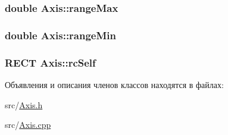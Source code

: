 \hypertarget{class_axis_a02853da582831baaa9ebc1289d86ad35}{
\subsubsection[{range\-Max}]{\setlength{\rightskip}{0pt plus 5cm}double Axis\-::range\-Max\hspace{0.3cm}{\ttfamily [protected]}}}\label{class_axis_a02853da582831baaa9ebc1289d86ad35}
\hypertarget{class_axis_adb0e6da2c0521df03e3e7d820d73af82}{
\subsubsection[{range\-Min}]{\setlength{\rightskip}{0pt plus 5cm}double Axis\-::range\-Min\hspace{0.3cm}{\ttfamily [protected]}}}\label{class_axis_adb0e6da2c0521df03e3e7d820d73af82}
\hypertarget{class_axis_a50bf5f208bbca7d528ca52e62b7928e9}{
\subsubsection[{rc\-Self}]{\setlength{\rightskip}{0pt plus 5cm}R\-E\-C\-T Axis\-::rc\-Self\hspace{0.3cm}{\ttfamily [protected]}}}\label{class_axis_a50bf5f208bbca7d528ca52e62b7928e9}


Объявления и описания членов классов находятся в файлах\-:\begin{DoxyCompactItemize}
\item 
src/\hyperlink{_axis_8h}{Axis.\-h}\item 
src/\hyperlink{_axis_8cpp}{Axis.\-cpp}\end{DoxyCompactItemize}
